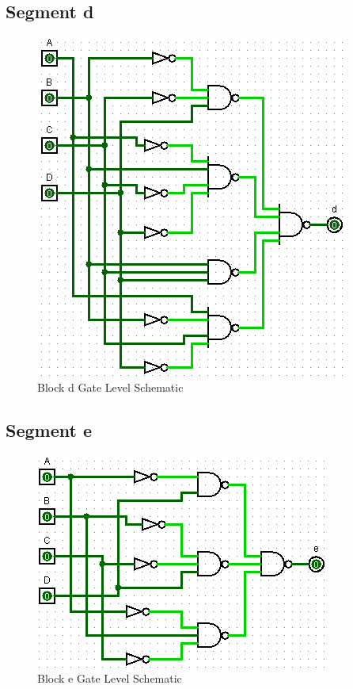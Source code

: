 \documentclass[12pt]{article}
\begin{document}
\subsection{Segment d}
\begin{figure}[H]
	\centering
	\label{fig:dBlockGates}
	\includegraphics[width=0.65\linewidth, keepaspectratio]{d_logicCkt}
	\caption{Block d Gate Level Schematic}
\end{figure}

\subsection{Segment e}
\begin{figure}[H]
	\centering
	\label{fig:eBlockGates}
	\includegraphics[width=0.65\linewidth, keepaspectratio]{e_logicCkt}
	\caption{Block e Gate Level Schematic}
\end{figure}

\end{document}
